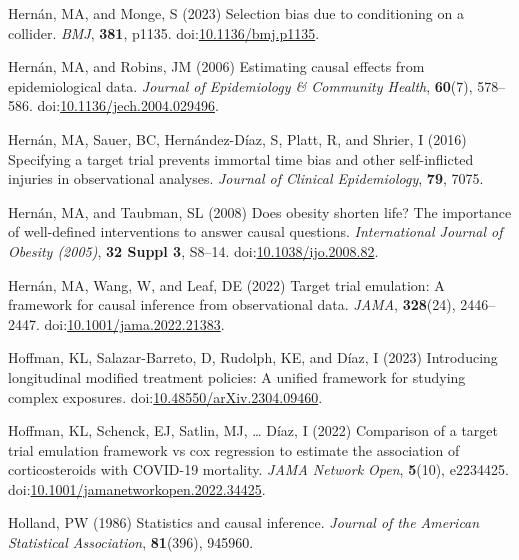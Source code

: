 \documentclass[
  singlecolumn,
  9pt]{article}
\begin{document}
\begin{CSLReferences}
Hernán, MA, and Monge, S (2023) Selection bias due to conditioning on a
collider. \emph{BMJ}, \textbf{381}, p1135.
doi:\href{https://doi.org/10.1136/bmj.p1135}{10.1136/bmj.p1135}.

Hernán, MA, and Robins, JM (2006) Estimating causal effects from
epidemiological data. \emph{Journal of Epidemiology \& Community
Health}, \textbf{60}(7), 578--586.
doi:\href{https://doi.org/10.1136/jech.2004.029496}{10.1136/jech.2004.029496}.

Hernán, MA, Sauer, BC, Hernández-Díaz, S, Platt, R, and Shrier, I (2016)
Specifying a target trial prevents immortal time bias and other
self-inflicted injuries in observational analyses. \emph{Journal of
Clinical Epidemiology}, \textbf{79}, 7075.

Hernán, MA, and Taubman, SL (2008) Does obesity shorten life? The
importance of well-defined interventions to answer causal questions.
\emph{International Journal of Obesity (2005)}, \textbf{32 Suppl 3},
S8--14.
doi:\href{https://doi.org/10.1038/ijo.2008.82}{10.1038/ijo.2008.82}.

Hernán, MA, Wang, W, and Leaf, DE (2022) Target trial emulation: A
framework for causal inference from observational data. \emph{JAMA},
\textbf{328}(24), 2446--2447.
doi:\href{https://doi.org/10.1001/jama.2022.21383}{10.1001/jama.2022.21383}.

Hoffman, KL, Salazar-Barreto, D, Rudolph, KE, and Díaz, I (2023)
Introducing longitudinal modified treatment policies: A unified
framework for studying complex exposures.
doi:\href{https://doi.org/10.48550/arXiv.2304.09460}{10.48550/arXiv.2304.09460}.

Hoffman, KL, Schenck, EJ, Satlin, MJ, \ldots{} Díaz, I (2022) Comparison
of a target trial emulation framework vs cox regression to estimate the
association of corticosteroids with COVID-19 mortality. \emph{JAMA
Network Open}, \textbf{5}(10), e2234425.
doi:\href{https://doi.org/10.1001/jamanetworkopen.2022.34425}{10.1001/jamanetworkopen.2022.34425}.

Holland, PW (1986) Statistics and causal inference. \emph{Journal of the
American Statistical Association}, \textbf{81}(396), 945960.


\end{CSLReferences}
\end{document}
